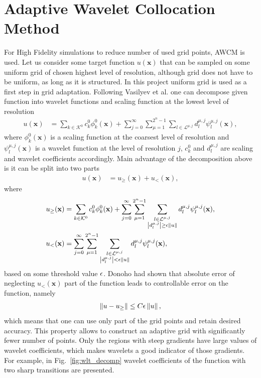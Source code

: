 \section{Adaptive Wavelet Collocation Method}
For High Fidelity simulations to reduce number of used grid points, AWCM is used. Let us consider some target function $u(\mathbf x)$ that can be sampled on some uniform grid of chosen highest level of resolution, although grid does not have to be uniform, as long as it is structured. In this project uniform grid is used as a first step in grid adaptation. Following Vasilyev et al. \cite{lib:wlt_main} one can decompose given function into wavelet functions and scaling function at the lowest level of resolution
\begin{align}
u(\mathbf x) &= \sum_{k \in \mathcal K^0} c_k^0 \phi_k^0 (\mathbf x) + \sum_{j = 0}^\infty \sum_{\mu = 1}^{2^n - 1} \sum_{l \in \mathcal L^{\mu, j}} d_l^{\mu, j} \psi_l^{\mu, j} (\mathbf x),
\end{align}
where $\phi_k^0(\mathbf x)$ is a scaling function at the coarsest level of resolution and $\psi_l^{\mu, j}(\mathbf x)$ is a wavelet function at the level of resolution $j$, $c_k^0$ and $d_l^{\mu, j}$ are scaling and wavelet coefficients accordingly. Main advantage of the decomposition above is it can be split into two parts
\begin{align}
u(\mathbf x) &= u_\ge (\mathbf x) + u_< (\mathbf x),
\end{align}
where
\begin{align}
\nonumber
u_\ge (\mathbf x) &= \sum_{k \in \mathcal K^0} c_k^0 \phi_k^0 (\mathbf x) + \sum_{j = 0}^\infty \sum_{\mu = 1}^{2^n - 1} \sum_{\substack{l \in \mathcal L^{\mu, j} \\ \left|d_l^{\mu, j}\right| \ge \epsilon \left\|u\right\| }} d_l^{\mu, j} \psi_l^{\mu, j} (\mathbf x), \\
u_<(\mathbf x) &= \sum_{j = 0}^\infty \sum_{\mu = 1}^{2^n - 1} \sum_{\substack{l \in \mathcal L^{\mu, j} \\ \left|d_l^{\mu, j}\right| < \epsilon \left\|u\right\| }} d_l^{\mu, j} \psi_l^{\mu, j} (\mathbf x),
\end{align}
based on some threshold value $\epsilon$. Donoho \cite{lib:donoho} had shown that absolute error of neglecting $u_<(\mathbf x)$ part of the function leads to controllable error on the function, namely
\begin{align}
\left\|u - u_\ge\right\| \le C \epsilon \left\|u\right\|,
\end{align}
which means that one can use only part of the grid points and retain desired accuracy. This property allows to construct an adaptive grid with significantly fewer number of points. Only the regions with steep gradients have large values of wavelet coefficients, which makes wavelets a good indicator of those gradients. For example, in Fig.~\ref{fig:wlt_decomp} wavelet coefficients of the function with two sharp transitions are presented.

